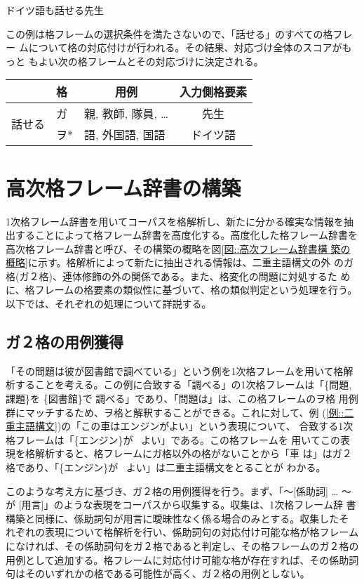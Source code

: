 \documentclass[fleqn]{nlp}
\begin{document}
\begin{exe}
 \ex ドイツ語も話せる先生
\end{exe}
この例は格フレームの選択条件を満たさないので、「話せる」のすべての格フレー
ムについて格の対応付けが行われる。その結果、対応づけ全体のスコアがもっと
もよい次の格フレームとその対応づけに決定される。
\begin{center}
 \begin{tabular}{l|l|l||c} \hline
                           & 格   & \multicolumn{1}{c||}{用例} & 入力側格要素 \\ \hline
 \multirow{2}{3zw}{話せる} & ガ   & 親, 教師, 隊員, … & 先生 \\
                           & ヲ*  & 語, 外国語, 国語 & ドイツ語 \\ \hline
 \end{tabular}
\end{center}


\section{高次格フレーム辞書の構築}

1次格フレーム辞書を用いてコーパスを格解析し、新たに分かる確実な情報を抽
出することによって格フレーム辞書を高度化する。高度化した格フレーム辞書を
高次格フレーム辞書と呼び、その構築の概略を図\ref{図::高次フレーム辞書構
築の概略}に示す。格解析によって新たに抽出される情報は、二重主語構文の外
のガ格(ガ２格)、連体修飾の外の関係である。また、格変化の問題に対処するた
めに、格フレームの格要素の類似性に基づいて、格の類似判定という処理を行う。
以下では、それぞれの処理について詳説する。


\subsection{ガ２格の用例獲得}

「その問題は彼が図書館で調べている」という例を1次格フレームを用いて格解
析することを考える。この例に合致する「調べる」の1次格フレームは「\{問題, 
課題\}を \{図書館\}で 調べる」であり、「問題は」は、この格フレームのヲ格
用例群にマッチするため、ヲ格と解釈することができる。これに対して、例
(\ref{例::二重主語構文})の「この車はエンジンがよい」という表現について、
合致する1次格フレームは「\{エンジン\}が \ よい」である。この格フレームを
用いてこの表現を格解析すると、格フレームにガ格以外の格がないことから「車
は」はガ２格であり、「\{エンジン\}が \ よい」は二重主語構文をとることが
わかる。

このような考え方に基づき、ガ２格の用例獲得を行う。まず、「〜[係助詞] … 
〜が [用言]」のような表現をコーパスから収集する。収集は、1次格フレーム辞
書構築と同様に、係助詞句が用言に曖昧性なく係る場合のみとする。収集したそ
れぞれの表現について格解析を行い、係助詞句の対応付け可能な格が格フレーム
になければ、その係助詞句をガ２格であると判定し、その格フレームのガ２格の
用例として追加する。格フレームに対応付け可能な格が存在すれば、その係助詞
句はそのいずれかの格である可能性が高く、ガ２格の用例としない。
\end{document}
